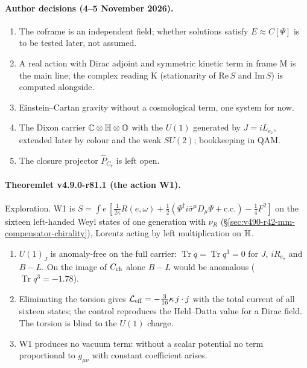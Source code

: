 \paragraph{Author decisions (4--5 November 2026).}
\begin{enumerate}[leftmargin=2em]
\item The coframe is an independent field; whether solutions satisfy \(E\approx C[\Psi]\) is to be tested later, not assumed.
\item A real action with Dirac adjoint and symmetric kinetic term in frame M is the main line; the complex reading K (stationarity
of \(\mathrm{Re}\,S\) and \(\mathrm{Im}\,S\)) is computed alongside.
\item Einstein--Cartan gravity without a cosmological term, one system for now.
\item The Dixon carrier \(\mathbb C\otimes\mathbb{H}\otimes\mathbb{O}\) with the \(U(1)\) generated by \(J=iL_{e_7}\), extended later by colour and the weak
\(SU(2)\); bookkeeping in QAM.
\item The closure projector \(\hat P_{C_7}\) is left open.
\end{enumerate}

\paragraph{Theoremlet v4.9.0-r81.1 (the action W1).}
Exploration.  W1 is \(S=\int e\,[\tfrac1{2\kappa}R(e,\omega)+\tfrac12(\Psi^\dagger i\bar\sigma^\mu D_\mu\Psi+\mathrm{c.c.})-\tfrac14F^2]\) on the sixteen
left-handed Weyl states of one generation with \(\nu_R\) (\S\ref{sec:v490-r42-mm-compensator-chirality}), Lorentz acting by left
multiplication on \(\mathbb{H}\).
\begin{enumerate}[leftmargin=2em]
\item[(a)] \(U(1)_J\) is anomaly-free on the full carrier: \(\operatorname{Tr}q=\operatorname{Tr}q^3=0\) for \(J\), \(iR_{e_7}\) and \(B-L\).  On the
image of \(C_{\rm ch}\) alone \(B-L\) would be anomalous (\(\operatorname{Tr}q^3=-1.78\)).
\item[(b)] Eliminating the torsion gives \(\mathcal L_{\rm eff}=-\tfrac3{16}\kappa\,j\cdot j\) with the total current of all sixteen states; the
control reproduces the Hehl--Datta value for a Dirac field.  The torsion is blind to the \(U(1)\) charge.
\item[(c)] W1 produces no vacuum term: without a scalar potential no term proportional to \(g_{\mu\nu}\) with constant coefficient arises.
\end{enumerate}

